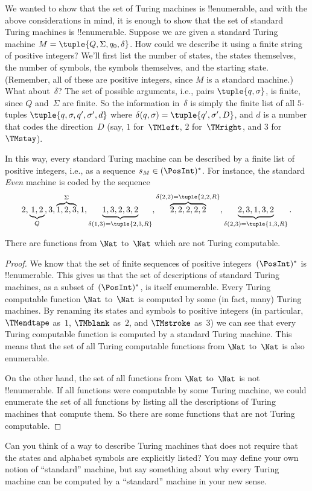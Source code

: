 \documentclass[../../../include/open-logic-section]{subfiles}
\begin{document}
\begin{explain}
We wanted to show that the set of Turing machines is !!{enumerable},
and with the above considerations in mind, it is enough to show that
the set of standard Turing machines is !!{enumerable}. Suppose we are
given a standard Turing machine $M = \tuple{Q, \Sigma, q_0, \delta}$.
How could we describe it using a finite string of positive integers?
We'll first list the number of states, the states themselves, the
number of symbols, the symbols themselves, and the starting state.
(Remember, all of these are positive integers, since $M$ is a standard
machine.)  What about~$\delta$? The set of possible arguments, i.e.,
pairs $\tuple{q,\sigma}$, is finite, since $Q$ and~$\Sigma$ are
finite. So the information in~$\delta$ is simply the finite list of
all $5$-tuples $\tuple{q, \sigma, q', \sigma', d}$ where
$\delta(q,\sigma) = \tuple{q', \sigma', D}$, and $d$ is a number that
codes the direction~$D$ (say, $1$ for~$\TMleft$, $2$ for~$\TMright$,
and $3$ for~$\TMstay$).

In this way, every standard Turing machine can be described by a
finite list of positive integers, i.e., as a sequence $s_M \in
(\PosInt)^*$. For instance, the standard \emph{Even} machine is coded
by the sequence
\[
2, \underbrace{1, 2}_Q, 3, \overbrace{1, 2, 3}^\Sigma, 1, \underbrace{1, 3, 2, 3, 2}_{\delta(1,3) = \tuple{2,3,R}}, 
\overbrace{2, 2, 2, 2, 2}^{\delta(2,2) = \tuple{2,2,R}},
\underbrace{2, 3, 1, 3, 2}_{\delta(2,3) = \tuple{1,3,R}}.
\]
\end{explain}

\begin{thm}
There are functions from $\Nat$ to~$\Nat$ which are not Turing
computable.
\end{thm}

\begin{proof}
We know that the set of finite sequences of positive
integers~$(\PosInt)^*$ is !!{enumerable}. This gives us that the set
of descriptions of standard Turing machines, as a subset
of~$(\PosInt)^*$, is itself enumerable.  Every Turing computable
function $\Nat$ to~$\Nat$ is computed by some (in fact, many) Turing
machines. By renaming its states and symbols to positive integers (in
particular, $\TMendtape$ as~$1$, $\TMblank$ as~$2$, and $\TMstroke$
as~$3$) we can see that every Turing computable function is computed
by a standard Turing machine. This means that the set of all Turing
computable functions from $\Nat$ to~$\Nat$ is also enumerable.

On the other hand, the set of all functions from $\Nat$ to~$\Nat$ is
not !!{enumerable}. If all functions
were computable by some Turing machine, we could enumerate the set of
all functions by listing all the descriptions of Turing machines that
compute them. So there are some functions that are not Turing
computable. 
\end{proof}

\begin{prob}
  Can you think of a way to describe Turing machines that does not
  require that the states and alphabet symbols are explicitly listed?
  You may define your own notion of ``standard'' machine, but say
  something about why every Turing machine can be computed by a
  ``standard'' machine in your new sense.
\end{prob}
\end{document}
